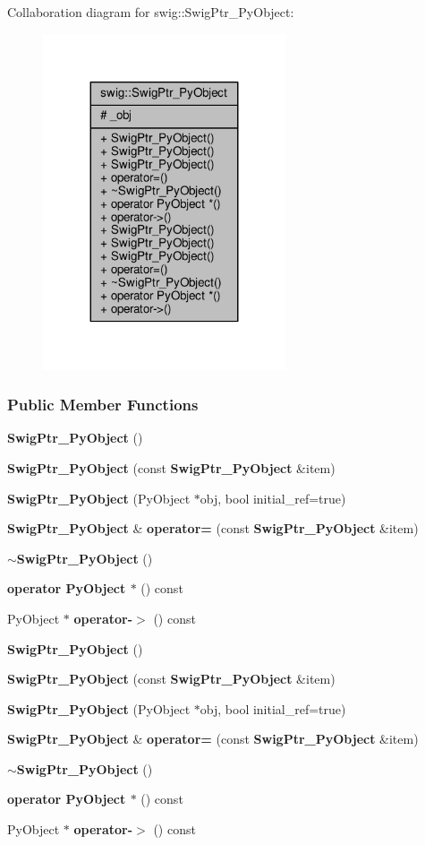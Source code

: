 Collaboration diagram for swig\+:\+:Swig\+Ptr\+\_\+\+Py\+Object\+:
\nopagebreak
\begin{figure}[H]
\begin{center}
\leavevmode
\includegraphics[width=203pt]{df/d73/classswig_1_1SwigPtr__PyObject__coll__graph}
\end{center}
\end{figure}
\subsubsection*{Public Member Functions}
\begin{DoxyCompactItemize}
\item 
{\bf Swig\+Ptr\+\_\+\+Py\+Object} ()
\item 
{\bf Swig\+Ptr\+\_\+\+Py\+Object} (const {\bf Swig\+Ptr\+\_\+\+Py\+Object} \&item)
\item 
{\bf Swig\+Ptr\+\_\+\+Py\+Object} (Py\+Object $\ast$obj, bool initial\+\_\+ref=true)
\item 
{\bf Swig\+Ptr\+\_\+\+Py\+Object} \& {\bf operator=} (const {\bf Swig\+Ptr\+\_\+\+Py\+Object} \&item)
\item 
{\bf $\sim$\+Swig\+Ptr\+\_\+\+Py\+Object} ()
\item 
{\bf operator Py\+Object $\ast$} () const 
\item 
Py\+Object $\ast$ {\bf operator-\/$>$} () const 
\item 
{\bf Swig\+Ptr\+\_\+\+Py\+Object} ()
\item 
{\bf Swig\+Ptr\+\_\+\+Py\+Object} (const {\bf Swig\+Ptr\+\_\+\+Py\+Object} \&item)
\item 
{\bf Swig\+Ptr\+\_\+\+Py\+Object} (Py\+Object $\ast$obj, bool initial\+\_\+ref=true)
\item 
{\bf Swig\+Ptr\+\_\+\+Py\+Object} \& {\bf operator=} (const {\bf Swig\+Ptr\+\_\+\+Py\+Object} \&item)
\item 
{\bf $\sim$\+Swig\+Ptr\+\_\+\+Py\+Object} ()
\item 
{\bf operator Py\+Object $\ast$} () const 
\item 
Py\+Object $\ast$ {\bf operator-\/$>$} () const 
\end{DoxyCompactItemize}
